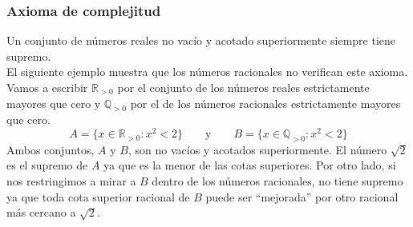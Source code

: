 \documentclass[Análisis.root.tex]{subfiles}
\newcommand{\Q}{\mathbb{Q}}
\newcommand{\R}{\mathbb{R}}
\begin{document}
        \subsubsection{Axioma de complejitud}
        Un conjunto de números reales no vacío y acotado superiormente siempre tiene supremo.\\
        El siguiente ejemplo muestra que los números racionales no verifican este axioma. Vamos a escribir \(\R_{>0}\) por el conjunto de los números reales estrictamente mayores que cero y \(\Q_{>0}\) por el de los números racionales estrictamente mayores que cero.
        \[A = \{x \in \R_{>0} : x^2 < 2\}\qquad\text{y}\qquad B = \{x \in \Q_{>0} : x^2 < 2\}\]
        Ambos conjuntos, \(A\) y \(B\), son no vacíos y acotados superiormente. El número \(\sqrt{2}\) es el supremo de \(A\) ya que es la menor de las cotas superiores. Por otro lado, si nos restringimos a mirar a \(B\) dentro de los números racionales, no tiene supremo ya que toda cota superior racional de \(B\) puede ser “mejorada” por otro racional más cercano a \(\sqrt{2}\).
\end{document}
